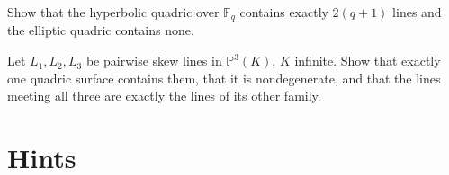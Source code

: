 \begin{exercise}[$\star\star$]\label{geometry:ex:linesFq}
Show that the hyperbolic quadric over $\mathbb F_q$ contains exactly $2(q+1)$ lines and the elliptic quadric contains none.
\end{exercise}

\begin{exercise}[$\star\star\star$]\label{geometry:ex:skewlines}
Let $L_1,L_2,L_3$ be pairwise skew lines in $\mathbb P^3(K)$, $K$ infinite. Show that exactly one quadric surface contains them, that it is
nondegenerate, and that the lines meeting all three are exactly the lines of its other family.
\end{exercise}

\section{Hints}


